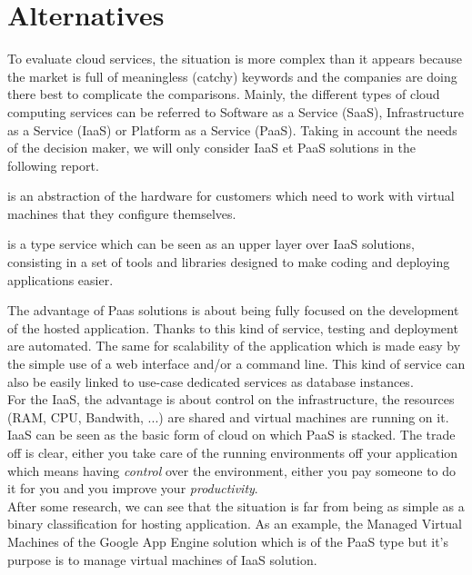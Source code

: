 \documentclass[a4paper,11pt]{article}
\begin{document}
\section{Alternatives}
To evaluate cloud services, the situation is more complex than it appears because the market is full of meaningless (catchy) keywords and the companies are doing there best to complicate the comparisons. Mainly, the different types of cloud computing services can be referred to Software as a Service (SaaS), Infrastructure as a Service (IaaS) or Platform as a Service (PaaS). Taking in account the needs of the decision maker, we will only consider IaaS et PaaS solutions in the following report.\\

\begin{description}[parsep=10pt,labelindent=\parindent]
  \item[IaaS] is an abstraction of the hardware for customers which need to work with virtual machines that they configure themselves.
  \item[PaaS] is a type service which can be seen as an upper layer over IaaS solutions, consisting in a set of tools and libraries designed to make coding and deploying applications easier.
\end{description}

The advantage of Paas solutions is about being fully focused on the development of the hosted application. Thanks to this kind of service, testing and deployment are automated. The same for scalability of the application which is made easy by the simple use of a web interface and/or a command line. This kind of service can also be easily linked to use-case dedicated services as database instances.\\

For the IaaS, the advantage is about control on the infrastructure, the resources (RAM, CPU, Bandwith, ...) are shared and virtual machines are running on it. IaaS can be seen as the basic form of cloud on which PaaS is stacked. The trade off is clear, either you take care of the running environments off your application which means having \emph{control} over the environment, either you pay someone to do it for you and you improve your \emph{productivity}.\\

After some research, we can see that the situation is far from being as simple as a binary classification for hosting application. As an example, the Managed Virtual Machines of the Google App Engine solution which is of the PaaS type but it's purpose is to manage virtual machines of IaaS solution.\\
\end{document}
